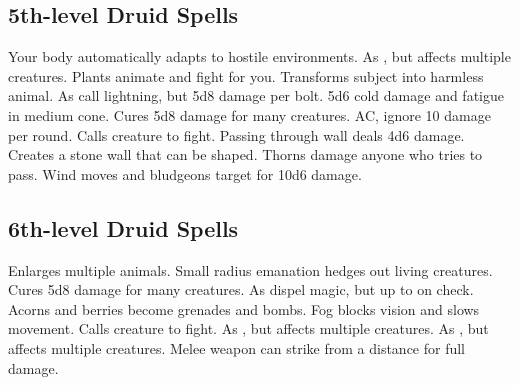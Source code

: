 \subsection{5th-level Druid Spells}
\begin{spelllist}
 Your body automatically adapts to hostile environments.
 As , but affects multiple creatures.
 Plants animate and fight for you.
 Transforms subject into harmless animal.
 As call lightning, but 5d8 damage per bolt.
 5d6 cold damage and fatigue in medium cone.
 Cures 5d8 damage for many creatures.
  AC, ignore 10 damage per round.
 Calls creature to fight.
 Passing through wall deals 4d6 damage.
 Creates a stone wall that can be shaped.
 Thorns damage anyone who tries to pass.
 Wind moves and bludgeons target for 10d6 damage.
\end{spelllist}

\subsection{6th-level Druid Spells}
\begin{spelllist}
 Enlarges multiple animals.
 Small radius emanation hedges out living creatures.
 Cures 5d8 damage for many creatures.
 As dispel magic, but up to  on check.
 Acorns and berries become grenades and bombs.
 Fog blocks vision and slows movement.
 Calls creature to fight.
 As , but affects multiple creatures.
 As , but affects multiple creatures.
 Melee weapon can strike from a distance for full damage.
\end{spelllist}

